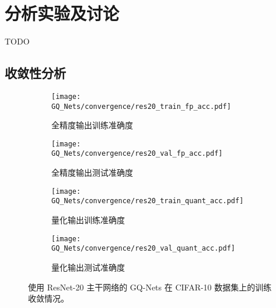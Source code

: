\section{分析实验及讨论}
TODO
\subsection{收敛性分析}

\begin{figure}[htb]
  \centering
  \begin{subfigure}[t]{0.45\columnwidth}
    \centering
    \texttt{[image: GQ\_Nets/convergence/res20\_train\_fp\_acc.pdf]}
    \caption{全精度输出训练准确度}
    \label{img::gq_nets::res20_train_fp_acc}
  \end{subfigure}
  \quad
  \begin{subfigure}[t]{0.45\columnwidth}
    \centering
    \texttt{[image: GQ\_Nets/convergence/res20\_val\_fp\_acc.pdf]}
    \caption{全精度输出测试准确度}
    \label{img::gq_nets::res20_eval_fp_acc}
  \end{subfigure}
  \newline
  \vspace*{0.5 cm}
  \newline
  \begin{subfigure}[t]{0.45\columnwidth}
    \centering
    \texttt{[image: GQ\_Nets/convergence/res20\_train\_quant\_acc.pdf]}
    \caption{量化输出训练准确度}
    \label{img::gq_nets::res20_train_quant_acc}
  \end{subfigure}
  \quad
  \begin{subfigure}[t]{0.45\columnwidth}
    \centering
    \texttt{[image: GQ\_Nets/convergence/res20\_val\_quant\_acc.pdf]}
    \caption{量化输出测试准确度}
    \label{img::gq_nets::res20_eval_quant_acc}
  \end{subfigure}
  \caption{使用 ResNet-20 主干网络的 GQ-Nets 在 CIFAR-10 数据集上的训练收敛情况。}
  \label{img::gq_nets::res20_convergence}
\end{figure}

